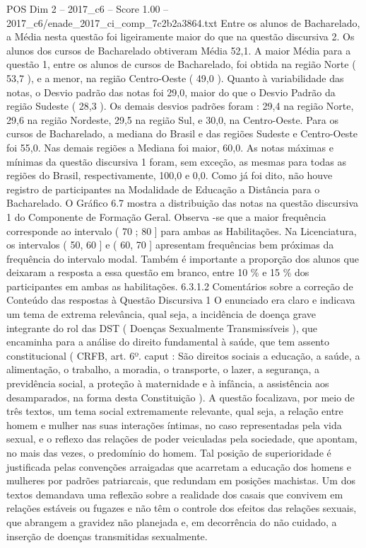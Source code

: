 \begin{textsample}{POS Dim 2 – 2017\_c6 – Score 1.00 – 2017\_c6/enade\_2017\_ci\_comp\_7c2b2a3864.txt}
Entre os alunos de Bacharelado, a Média nesta questão foi ligeiramente maior do que na questão discursiva 2.
Os alunos dos cursos de Bacharelado obtiveram Média 52,1.
A maior Média para a questão 1, entre os alunos de cursos de Bacharelado, foi obtida na região Norte ( 53,7 ), e a menor, na região Centro-Oeste ( 49,0 ).
Quanto à variabilidade das notas, o Desvio padrão das notas foi 29,0, maior do que o Desvio Padrão da região Sudeste ( 28,3 ).
Os demais desvios padrões foram : 29,4 na região Norte, 29,6 na região Nordeste, 29,5 na região Sul, e 30,0, na Centro-Oeste.
Para os cursos de Bacharelado, a mediana do Brasil e das regiões Sudeste e Centro-Oeste foi 55,0.
Nas demais regiões a Mediana foi maior, 60,0.
As notas máximas e mínimas da questão discursiva 1 foram, sem exceção, as mesmas para todas as regiões do Brasil, respectivamente, 100,0 e 0,0.
Como já foi dito, não houve registro de participantes na Modalidade de Educação a Distância para o Bacharelado.
O Gráfico 6.7 mostra a distribuição das notas na questão discursiva 1 do Componente de Formação Geral.
Observa -se que a maior frequência corresponde ao intervalo ( 70 ; 80 ] para ambas as Habilitações.
Na Licenciatura, os intervalos ( 50, 60 ] e ( 60, 70 ] apresentam frequências bem próximas da frequência do intervalo modal.
Também é importante a proporção dos alunos que deixaram a resposta a essa questão em branco, entre 10 \% e 15 \% dos participantes em ambas as habilitações. 6.3.1.2 Comentários sobre a correção de Conteúdo das respostas à Questão Discursiva 1 O enunciado era claro e indicava um tema de extrema relevância, qual seja, a incidência de doença grave integrante do rol das DST ( Doenças Sexualmente Transmissíveis ), que encaminha para a análise do direito fundamental à saúde, que tem assento constitucional ( CRFB, art. 6º. caput : São direitos sociais a educação, a saúde, a alimentação, o trabalho, a moradia, o transporte, o lazer, a segurança, a previdência social, a proteção à maternidade e à infância, a assistência aos desamparados, na forma desta Constituição ).
A questão focalizava, por meio de três textos, um tema social extremamente relevante, qual seja, a relação entre homem e mulher nas suas interações íntimas, no caso representadas pela vida sexual, e o reflexo das relações de poder veiculadas pela sociedade, que apontam, no mais das vezes, o predomínio do homem.
Tal posição de superioridade é justificada pelas convenções arraigadas que acarretam a educação dos homens e mulheres por padrões patriarcais, que redundam em posições machistas.
Um dos textos demandava uma reflexão sobre a realidade dos casais que convivem em relações estáveis ou fugazes e não têm o controle dos efeitos das relações sexuais, que abrangem a gravidez não planejada e, em decorrência do não cuidado, a inserção de doenças transmitidas sexualmente.

\end{textsample}
